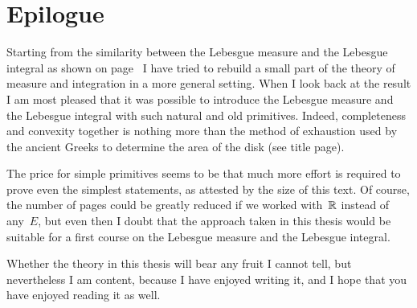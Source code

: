 \section{Epilogue}
\noindent
Starting from the similarity
between
 the Lebesgue measure
and the Lebesgue integral
as shown  on page~\pageref{S:intro}
I have tried to 
rebuild
a small part of the theory of
measure and integration 
in a more general setting.
When I look back at the result
I am most pleased that it was possible
to introduce the Lebesgue measure and the Lebesgue integral
with such natural and old primitives.
Indeed,
completeness and convexity
together
is nothing more than
the method of exhaustion
used by the ancient Greeks 
to determine the area of the disk (see title page).

The price for simple primitives
seems to be that much more effort is
required to prove even the simplest statements,
as attested by the size of this text.
Of course,
the number of pages could be
greatly reduced if we worked with~$\mathbb{R}$
instead of any~$E$,
but even then
I doubt that the approach taken
in this thesis would
be suitable
for a first course on the Lebesgue measure
and the Lebesgue integral.

Whether the theory in this thesis
will bear any fruit
I cannot tell,
but nevertheless I am content,
because I have enjoyed writing it,
and I hope that you have enjoyed reading it as well.
\label{S:conclusion}
